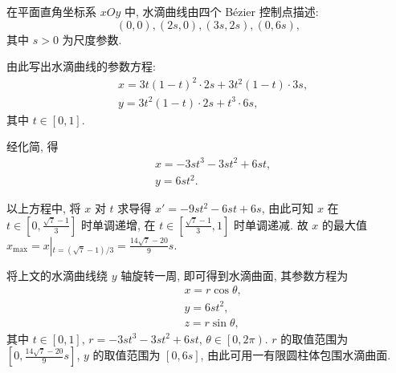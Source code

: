 \documentclass{ctexart}
\begin{document}
在平面直角坐标系 $xOy$ 中, 水滴曲线由四个 Bézier 控制点描述: \[
    \left(0, 0\right), \left(2s, 0\right), \left(3s, 2s\right), \left(0, 6s\right),
\]
其中 $s>0$ 为尺度参数.

由此写出水滴曲线的参数方程: 
\begin{align*}[left={\empheqlbrace}]
    & x = 3t\left(1-t\right)^2 \cdot 2s + 3t^2\left(1-t\right) \cdot 3s, \\
    & y = 3t^2\left(1-t\right) \cdot 2s + t^3 \cdot 6s,
\end{align*}
其中 $t\in\left[0, 1\right]$.

经化简, 得
\begin{align*}[left={\empheqlbrace}]
    & x = -3st^3-3st^2+6st, \\
    & y = 6st^2.
\end{align*}

以上方程中, 将 $x$ 对 $t$ 求导得 $x'=-9st^2-6st+6s$, 由此可知 $x$ 在 $t\in\left[0, \displaystyle\frac{\sqrt{7}-1}{3}\right]$ 时单调递增, 在 $t\in\left[\displaystyle\frac{\sqrt{7}-1}{3}, 1\right]$ 时单调递减. 故 $x$ 的最大值 $x_{\max} = x\left|_{t=\left(\sqrt{7}-1\right)/3}\right. = \displaystyle\frac{14\sqrt{7}-20}{9}s$.

\mbox{}

将上文的水滴曲线绕 $y$ 轴旋转一周, 即可得到水滴曲面, 其参数方程为
\begin{align*}[left={\empheqlbrace}]
    & x = r\cos{\theta}, \\
    & y = 6st^2, \\
    & z = r\sin{\theta},
\end{align*}
其中 $t\in\left[0, 1\right]$, $r = -3st^3-3st^2+6st$, $\theta\in\left[0, 2\pi\right)$. $r$ 的取值范围为 $\left[0, \displaystyle\frac{14\sqrt{7}-20}{9}s\right]$, $y$ 的取值范围为 $\left[0, 6s\right]$, 由此可用一有限圆柱体包围水滴曲面.
\end{document}
